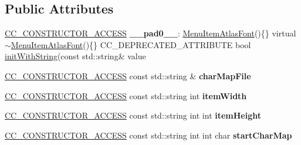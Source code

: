 \subsection*{Public Attributes}
\begin{DoxyCompactItemize}
\item 
\mbox{\label{classMenuItemAtlasFont_aa93a11c58c25d18e25bdb78edb0f89e7}} 
\hyperlink{_2cocos2d_2cocos_2base_2ccConfig_8h_a25ef1314f97c35a2ed3d029b0ead6da0}{C\+C\+\_\+\+C\+O\+N\+S\+T\+R\+U\+C\+T\+O\+R\+\_\+\+A\+C\+C\+E\+SS} {\bfseries \+\_\+\+\_\+pad0\+\_\+\+\_\+}\+: \hyperlink{classMenuItemAtlasFont}{Menu\+Item\+Atlas\+Font}()\{\} virtual $\sim$\hyperlink{classMenuItemAtlasFont}{Menu\+Item\+Atlas\+Font}()\{\} C\+C\+\_\+\+D\+E\+P\+R\+E\+C\+A\+T\+E\+D\+\_\+\+A\+T\+T\+R\+I\+B\+U\+TE bool \hyperlink{classMenuItemAtlasFont_a72356ec71430cdd8b632e28bd8ec47d5}{init\+With\+String}(const std\+::string\& value
\item 
\mbox{\label{classMenuItemAtlasFont_a41455cce5e2b1a3b8a7f8150fd559c40}} 
\hyperlink{_2cocos2d_2cocos_2base_2ccConfig_8h_a25ef1314f97c35a2ed3d029b0ead6da0}{C\+C\+\_\+\+C\+O\+N\+S\+T\+R\+U\+C\+T\+O\+R\+\_\+\+A\+C\+C\+E\+SS} const std\+::string \& {\bfseries char\+Map\+File}
\item 
\mbox{\label{classMenuItemAtlasFont_ad7c872f88be41da090e687d20fb803a3}} 
\hyperlink{_2cocos2d_2cocos_2base_2ccConfig_8h_a25ef1314f97c35a2ed3d029b0ead6da0}{C\+C\+\_\+\+C\+O\+N\+S\+T\+R\+U\+C\+T\+O\+R\+\_\+\+A\+C\+C\+E\+SS} const std\+::string int {\bfseries item\+Width}
\item 
\mbox{\label{classMenuItemAtlasFont_a27b5fa64f0248300587a7482a93c989f}} 
\hyperlink{_2cocos2d_2cocos_2base_2ccConfig_8h_a25ef1314f97c35a2ed3d029b0ead6da0}{C\+C\+\_\+\+C\+O\+N\+S\+T\+R\+U\+C\+T\+O\+R\+\_\+\+A\+C\+C\+E\+SS} const std\+::string int int {\bfseries item\+Height}
\item 
\mbox{\label{classMenuItemAtlasFont_aaf10d902312de5bda0dd9f2bc5f9e8b4}} 
\hyperlink{_2cocos2d_2cocos_2base_2ccConfig_8h_a25ef1314f97c35a2ed3d029b0ead6da0}{C\+C\+\_\+\+C\+O\+N\+S\+T\+R\+U\+C\+T\+O\+R\+\_\+\+A\+C\+C\+E\+SS} const std\+::string int int char {\bfseries start\+Char\+Map}
\item 
\mbox{\label{classMenuItemAtlasFont_a9ae2abdd4239f3c37d1de7cbb5c2bbe4}} 

\end{DoxyCompactItemize}
